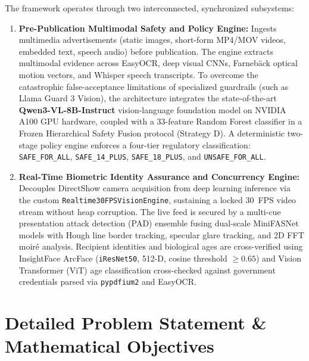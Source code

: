 \documentclass[12pt,a4paper]{report}
\begin{document}
The framework operates through two interconnected, synchronized subsystems:
\begin{enumerate}
    \item \textbf{Pre-Publication Multimodal Safety and Policy Engine:} Ingests multimedia advertisements (static images, short-form MP4/MOV videos, embedded text, speech audio) before publication. The engine extracts multimodal evidence across EasyOCR, deep visual CNNs, Farneb\"{a}ck optical motion vectors, and Whisper speech transcripts. To overcome the catastrophic false-acceptance limitations of specialized guardrails (such as Llama Guard 3 Vision), the architecture integrates the state-of-the-art \textbf{Qwen3-VL-8B-Instruct} vision-language foundation model on NVIDIA A100 GPU hardware, coupled with a 33-feature Random Forest classifier in a Frozen Hierarchical Safety Fusion protocol (Strategy D). A deterministic two-stage policy engine enforces a four-tier regulatory classification: \texttt{SAFE\_FOR\_ALL}, \texttt{SAFE\_14\_PLUS}, \texttt{SAFE\_18\_PLUS}, and \texttt{UNSAFE\_FOR\_ALL}.
    \item \textbf{Real-Time Biometric Identity Assurance and Concurrency Engine:} Decouples DirectShow camera acquisition from deep learning inference via the custom \texttt{Realtime30FPSVisionEngine}, sustaining a locked 30~FPS video stream without heap corruption. The live feed is secured by a multi-cue presentation attack detection (PAD) ensemble fusing dual-scale MiniFASNet models with Hough line border tracking, specular glare tracking, and 2D FFT moir\'{e} analysis. Recipient identities and biological ages are cross-verified using InsightFace ArcFace (\texttt{iResNet50}, 512-D, cosine threshold $\ge 0.65$) and Vision Transformer (ViT) age classification cross-checked against government credentials parsed via \texttt{pypdfium2} and EasyOCR.
\end{enumerate}

\section{Detailed Problem Statement \& Mathematical Objectives}
\end{document}
